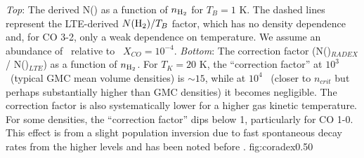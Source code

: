 {{\it Top}: The derived N(\hh) as a function of $n_{\textrm{H}_{2}}$ for $T_{B}=1$ K.
The dashed lines represent the LTE-derived $N(\textrm{H}_{2})/T_B$ factor, which has 
no density dependence and, for CO 3-2, only a weak dependence on temperature.
We assume an abundance of \twelveco\ relative to \hh\ $X_{CO} = 10^{-4}$.
{\it Bottom}: The correction factor (N(\hh)$_{RADEX}$ / N(\hh)$_{LTE}$) as
a function of $n_{\textrm{H}_{2}}$.
For $T_K=20$ K, the ``correction factor'' at $10^3$ \percc\ (typical GMC
mean volume densities) is $\sim15$, while at $10^4$ \percc\ (closer to $n_{crit}$ but
perhaps substantially higher than GMC densities) it becomes negligible.  The
correction factor is also systematically lower for a higher gas kinetic
temperature.
For some densities, the ``correction factor'' dips below 1, particularly for CO
1-0.  This effect is from a slight population inversion due to fast spontaneous
decay rates from the higher levels and has been noted before
\citep[e.g.][]{Goldsmith1972}.
}{fig:coradex}{0.5}{0}

%
